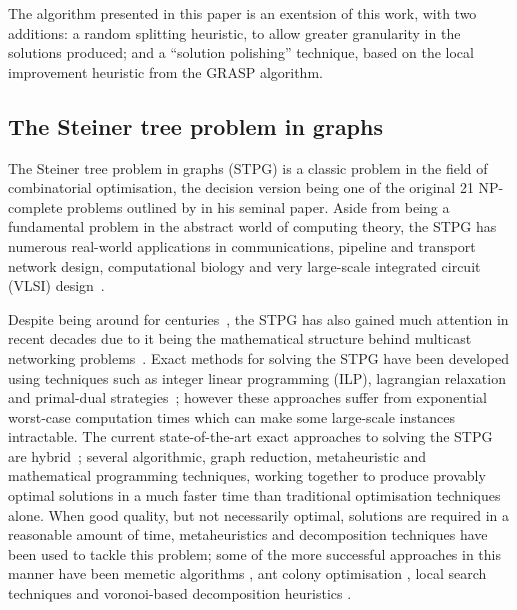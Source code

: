 \documentclass[journal]{IEEEtran}
\begin{document}
The algorithm presented in this paper is an exentsion of this work, with two additions: a random splitting heuristic, to allow greater granularity in the solutions produced; and a ``solution polishing'' technique, based on the local improvement heuristic from the GRASP algorithm.


\subsection{The Steiner tree problem in graphs}

The Steiner tree problem in graphs (STPG) is a classic problem in the field
of combinatorial optimisation, the decision version being one of the original 
21 NP-complete problems outlined by \cite{np:karp} in his seminal paper.
Aside from being a fundamental problem in the abstract world of computing theory, 
the STPG has numerous real-world applications in communications, pipeline and transport network
design, computational biology and very
large-scale integrated circuit (VLSI) design~\cite{vlsi:cho}.\par 
Despite being around for centuries~\cite{history:brazil}, the STPG has also gained
much attention in recent decades due to it being the mathematical structure behind 
multicast networking problems~\cite{steiner:hwang}. Exact methods for solving the STPG 
have been developed using techniques such as integer linear programming (ILP), 
lagrangian relaxation and primal-dual strategies~\cite{pd:polzin}; however these approaches suffer from
exponential worst-case computation times which can make some large-scale instances intractable. The current state-of-the-art 
exact approaches to solving the STPG are hybrid~\cite{algo:polzin,algo:daneshmand}; 
several algorithmic, graph reduction, metaheuristic and 
mathematical programming techniques, working together to produce provably optimal solutions
in a much faster time than traditional optimisation techniques alone.
When good quality, but not necessarily optimal, solutions are required in a reasonable amount of
time, metaheuristics and decomposition techniques have been used to tackle this problem; some of the
more successful approaches in this manner have been memetic algorithms \cite{memetic:klau}, ant colony optimisation
\cite{aco:singh,acogroup:nguyen}, local search techniques 
\cite{fastls:uchoa,effectivels:wade} and voronoi-based 
decomposition heuristics \cite{partition:leitner}.\par
\end{document}
